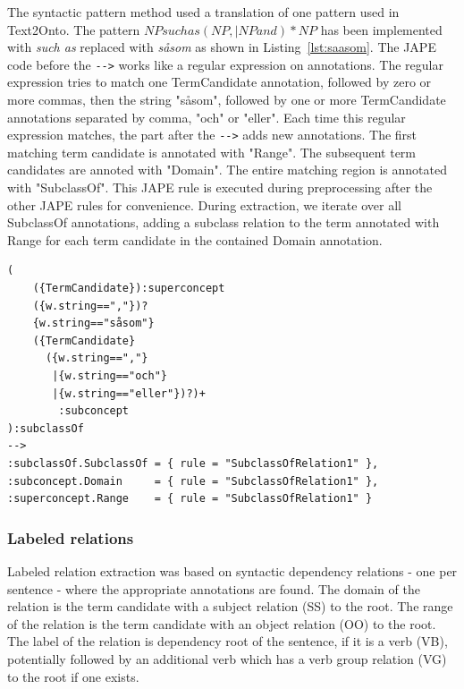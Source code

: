 \documentclass[a4paper]{report}
\begin{document}
The syntactic pattern method used a translation of one pattern used in Text2Onto\cite{Cimiano2005Text2Onto}.
The pattern \(NP such as (NP, |NP and)* NP\) has been implemented with \emph{such as} replaced with \emph{såsom} as shown in Listing~\ref{lst:saasom}.
The JAPE code before the \verb+-->+ works like a regular expression on annotations.
The regular expression tries to match one TermCandidate annotation, followed by zero or more commas, then the string "såsom", followed by one or more TermCandidate annotations separated by comma, "och" or "eller".
Each time this regular expression matches, the part after the \verb+-->+ adds new annotations.
The first matching term candidate is annotated with "Range".
The subsequent term candidates are annoted with "Domain".
The entire matching region is annotated with "SubclassOf".
This JAPE rule is executed during preprocessing after the other JAPE rules for convenience.
During extraction, we iterate over all SubclassOf annotations, adding a subclass relation to the term annotated with Range for each term candidate in the contained Domain annotation.

\begin{Code}
\begin{lstlisting}[frame=single]
(
	({TermCandidate}):superconcept
	({w.string==","})?
	{w.string=="såsom"}
	({TermCandidate}
	  ({w.string==","}
	   |{w.string=="och"}
	   |{w.string=="eller"})?)+
	    :subconcept
):subclassOf
-->
:subclassOf.SubclassOf = { rule = "SubclassOfRelation1" },
:subconcept.Domain     = { rule = "SubclassOfRelation1" },
:superconcept.Range    = { rule = "SubclassOfRelation1" }
\end{lstlisting}
\end{Code}

\subsubsection{Labeled relations}
\label{sec:results:proto:cands}

Labeled relation extraction was based on syntactic dependency relations - one per sentence - where the appropriate annotations are found.
The domain of the relation is the term candidate with a subject relation (SS) to the root.
The range of the relation is the term candidate with an object relation (OO) to the root.
The label of the relation is dependency root of the sentence, if it is a verb (VB), potentially followed by an additional verb which has a verb group relation (VG) to the root if one exists.
\end{document}
